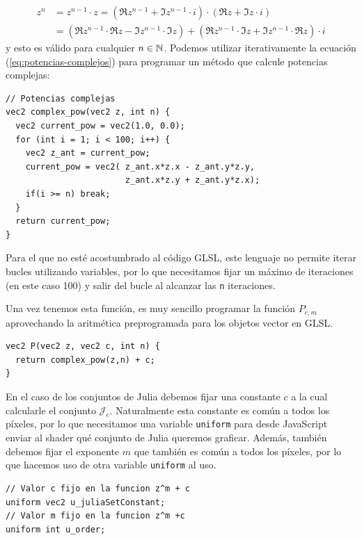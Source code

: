\begin{equation}
    \label{eq:potencias-complejos}
    \begin{split}
        z^n & = z^{n-1}\cdot z = (\Re z^{n-1} + \Im z^{n-1}\cdot i)\cdot(\Re z + \Im z\cdot i) \\
        & = \left(\Re z^{n-1}\cdot\Re z - \Im z^{n-1}\cdot \Im z\right) + \left(\Re z^{n-1}\cdot\Im z + \Im z^{n-1}\cdot\Re z\right)\cdot i 
    \end{split}
\end{equation}
y esto es válido para cualquier $n\in\mathbb{N}$. Podemos utilizar iterativamente la ecuación (\ref{eq:potencias-complejos}) para programar un método que calcule potencias complejas:
\begin{lstlisting}
// Potencias complejas
vec2 complex_pow(vec2 z, int n) {
  vec2 current_pow = vec2(1.0, 0.0);
  for (int i = 1; i < 100; i++) {
    vec2 z_ant = current_pow;
    current_pow = vec2( z_ant.x*z.x - z_ant.y*z.y, 
                        z_ant.x*z.y + z_ant.y*z.x);
    if(i >= n) break;
  }
  return current_pow;
}
\end{lstlisting}

Para el que no esté acostumbrado al código GLSL, este lenguaje no permite iterar bucles utilizando variables, por lo que necesitamos fijar un máximo de iteraciones (en este caso 100) y salir del bucle al alcanzar las \verb|n| iteraciones.

Una vez tenemos esta función, es muy sencillo programar la función $P_{c,m}$ aprovechando la aritmética preprogramada para los objetos vector en GLSL.

\begin{lstlisting}
vec2 P(vec2 z, vec2 c, int n) {
  return complex_pow(z,n) + c;
}
\end{lstlisting}

En el caso de los conjuntos de Julia debemos fijar una constante $c$ a la cual calcularle el conjunto $\mathcal{J}_c$. Naturalmente esta constante es común a todos los píxeles, por lo que necesitamos una variable \verb|uniform| para desde JavaScript enviar al shader qué conjunto de Julia queremos graficar. Además, también debemos fijar el exponente $m$ que también es común a todos los píxeles, por lo que hacemos uso de otra variable \verb|uniform| al uso.

\begin{lstlisting}
// Valor c fijo en la funcion z^m + c
uniform vec2 u_juliaSetConstant;
// Valor m fijo en la funcion z^m +c
uniform int u_order;
\end{lstlisting}

